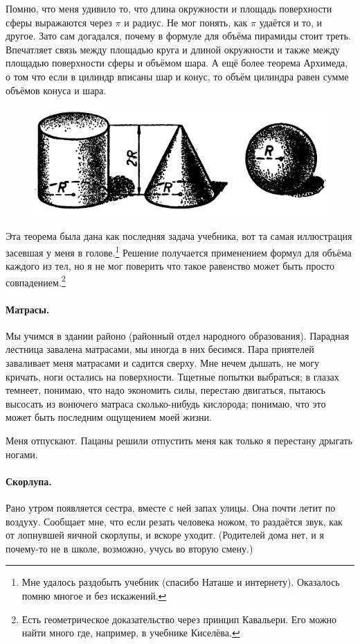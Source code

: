 \documentclass{book}
\begin{document}
Помню, что меня удивило то, что длина окружности и площадь поверхности сферы выражаются через $\pi$ и радиус.
Не мог понять, как $\pi$ удаётся и то, и другое.
Зато сам догадался, почему в формуле для объёма пирамиды стоит треть.
Впечатляет связь между площадью круга и длиной окружности 
и также между площадью поверхности сферы и объёмом шара.
А ещё более теорема Архимеда, о том что если в цилиндр вписаны шар и конус, 
то объём цилиндра равен сумме объёмов конуса и шара.
\begin{figure}[ht!]
\centering
\includegraphics[scale=.2]{pics/tzilindr-konus-shar}
\end{figure}
Эта теорема была дана как последняя задача учебника, вот та самая иллюстрация засевшая у меня в голове.\footnote{Мне удалось раздобыть учебник (спасибо Наташе и интернету).
Оказалось помню многое и без искажений.}
Решение получается применением формул для объёма каждого из тел, но я не мог поверить что такое равенство может быть просто совпадением.\footnote{Есть геометрическое доказательство через принцип Кавальери. Его можно найти много где, например, в учебнике Киселёва.}


\paragraph{Матрасы.}
Мы учимся в здании районо (районный отдел народного образования).
Парадная лестница завалена матрасами,
мы иногда в них бесимся.
Пара приятелей заваливает меня матрасами и садится сверху.
Мне нечем дышать, не могу кричать, ноги остались на поверхности.
Тщетные попытки выбраться;
в глазах темнеет, понимаю, что надо экономить силы, перестаю двигаться, пытаюсь высосать из вонючего матраса сколько-нибудь кислорода; 
понимаю, что это может быть последним ощущением моей жизни.

Меня отпускают.
Пацаны решили отпустить меня как только я перестану дрыгать ногами.

\paragraph{Скорлупа.}
Рано утром появляется сестра, вместе с ней запах улицы.
Она почти летит по воздуху.
Сообщает мне, что если резать человека ножом, то раздаётся звук, как от лопнувшей яичной скорлупы, и
вскоре уходит.
(Родителей дома нет, и я почему-то не в школе, возможно, учусь во вторую смену.)
\end{document}
